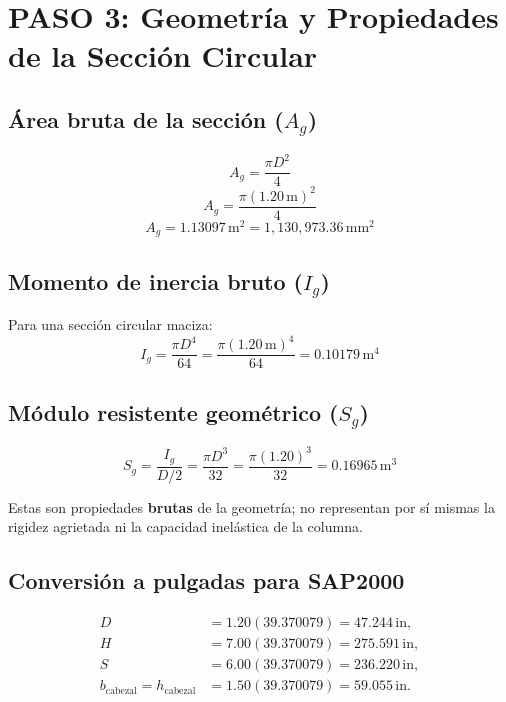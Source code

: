 \documentclass[11pt,a4paper]{article}
\begin{document}
\section{PASO 3: Geometría y Propiedades de la Sección Circular}

\subsection{Área bruta de la sección ($A_g$)}
\begin{equation*}
A_g=\frac{\pi D^2}{4}
\end{equation*}
\begin{equation*}
A_g=\frac{\pi(1.20\,\mathrm{m})^2}{4}
\end{equation*}
\begin{equation*}
\boxed{A_g=1.13097\,\mathrm{m}^2=1{,}130{,}973.36\,\mathrm{mm}^2}
\end{equation*}

\subsection{Momento de inercia bruto ($I_g$)}
Para una sección circular maciza:
\begin{equation*}
I_g=\frac{\pi D^4}{64}
  =\frac{\pi(1.20\,\mathrm{m})^4}{64}
  =\boxed{0.10179\,\mathrm{m}^4}
\end{equation*}

\subsection{Módulo resistente geométrico ($S_g$)}
\begin{equation*}
S_g=\frac{I_g}{D/2}=\frac{\pi D^3}{32}
=\frac{\pi(1.20)^3}{32}
=\boxed{0.16965\,\mathrm{m}^3}
\end{equation*}

Estas son propiedades \textbf{brutas} de la geometría; no representan por sí
mismas la rigidez agrietada ni la capacidad inelástica de la columna.

\subsection{Conversión a pulgadas para SAP2000}
\begin{align*}
D&=1.20(39.370079)=\boxed{47.244\,\mathrm{in}},\\
H&=7.00(39.370079)=\boxed{275.591\,\mathrm{in}},\\
S&=6.00(39.370079)=\boxed{236.220\,\mathrm{in}},\\
b_{\mathrm{cabezal}}=h_{\mathrm{cabezal}}&=1.50(39.370079)=\boxed{59.055\,\mathrm{in}}.
\end{align*}
\end{document}
